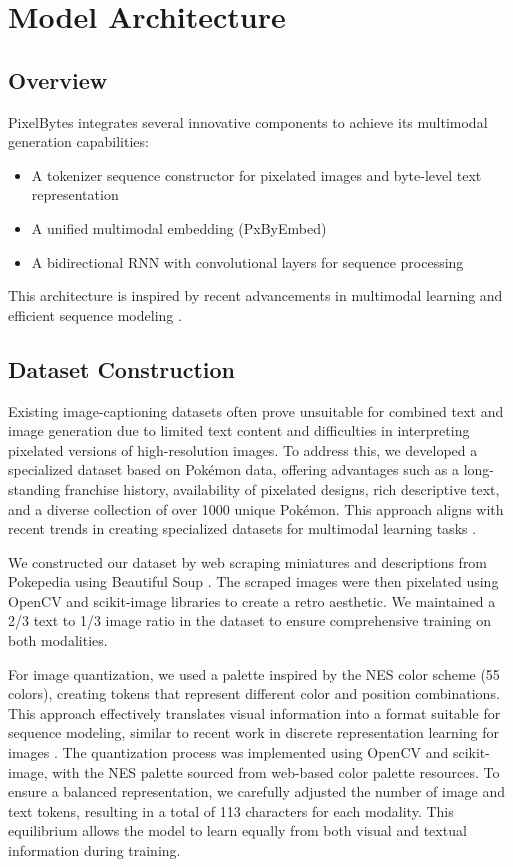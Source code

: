 \documentclass[10pt,a4paper]{article}
\begin{document}
\section{Model Architecture}

\subsection{Overview}
PixelBytes integrates several innovative components to achieve its multimodal generation capabilities:
\begin{itemize}
    \item A tokenizer sequence constructor for pixelated images and byte-level text representation
    \item A unified multimodal embedding (PxByEmbed)
    \item A bidirectional RNN with convolutional layers for sequence processing
\end{itemize}

This architecture is inspired by recent advancements in multimodal learning \cite{baltrusaitis2019multimodal} and efficient sequence modeling \cite{vaswani2017attention}.

\subsection{Dataset Construction}

Existing image-captioning datasets often prove unsuitable for combined text and image generation due to limited text content and difficulties in interpreting pixelated versions of high-resolution images. To address this, we developed a specialized dataset based on Pokémon data, offering advantages such as a long-standing franchise history, availability of pixelated designs, rich descriptive text, and a diverse collection of over 1000 unique Pokémon. This approach aligns with recent trends in creating specialized datasets for multimodal learning tasks \cite{lin2014microsoft}.

We constructed our dataset by web scraping miniatures and descriptions from Pokepedia using Beautiful Soup \cite{richardson2007beautiful}. The scraped images were then pixelated using OpenCV and scikit-image libraries \cite{bradski2000opencv, vanderwalt2014scikit} to create a retro aesthetic. We maintained a 2/3 text to 1/3 image ratio in the dataset to ensure comprehensive training on both modalities.

For image quantization, we used a palette inspired by the NES color scheme (55 colors), creating tokens that represent different color and position combinations. This approach effectively translates visual information into a format suitable for sequence modeling, similar to recent work in discrete representation learning for images \cite{van2017neural}. The quantization process was implemented using OpenCV and scikit-image, with the NES palette sourced from web-based color palette resources. To ensure a balanced representation, we carefully adjusted the number of image and text tokens, resulting in a total of 113 characters for each modality. This equilibrium allows the model to learn equally from both visual and textual information during training.
\end{document}
